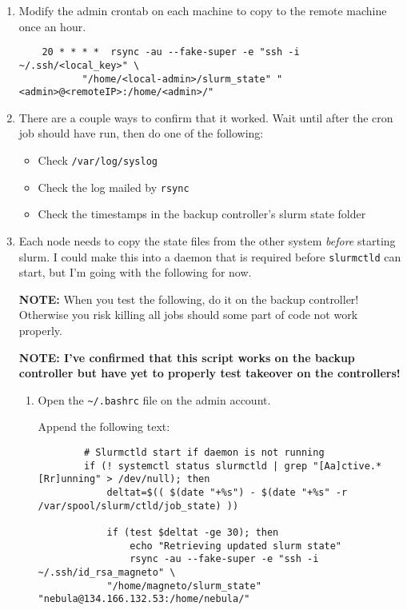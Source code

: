 \begin{enumerate}
\item \label{list:sshkeys} Modify the admin crontab on each machine to copy to the remote machine once an hour.

	\begin{verbatim}
	20 * * * *  rsync -au --fake-super -e "ssh -i ~/.ssh/<local_key>" \
	       "/home/<local-admin>/slurm_state" "<admin>@<remoteIP>:/home/<admin>/"
	\end{verbatim}

\item There are a couple ways to confirm that it worked. Wait until after the cron job should have run, then do one of the following:
	\begin{itemize}
	\item Check \texttt{/var/log/syslog}
	\item Check the log mailed by \texttt{rsync}
	\item Check the timestamps in the backup controller's slurm state folder
	\end{itemize}

\item Each node needs to copy the state files from the other system \emph{before} starting slurm. I could make this into a daemon that is required before \texttt{slurmctld} can start, but I'm going with the following for now. 

	\textbf{NOTE:} When you test the following, do it on the backup controller! Otherwise you risk killing all jobs should some part of code not work properly.

	\textbf{NOTE: I've confirmed that this script works on the backup controller but have yet to properly test takeover on the controllers!}

	\begin{enumerate}
	\item Open the \texttt{\textasciitilde /.bashrc} file on the admin account.

		Append the following text:
		\begin{verbatim}
		# Slurmctld start if daemon is not running
		if (! systemctl status slurmctld | grep "[Aa]ctive.*[Rr]unning" > /dev/null); then
		    deltat=$(( $(date "+%s") - $(date "+%s" -r /var/spool/slurm/ctld/job_state) ))

		    if (test $deltat -ge 30); then
		        echo "Retrieving updated slurm state"
		        rsync -au --fake-super -e "ssh -i ~/.ssh/id_rsa_magneto" \
		    "/home/magneto/slurm_state" "nebula@134.166.132.53:/home/nebula/"


\end{verbatim}
\end{enumerate}
\end{enumerate}
